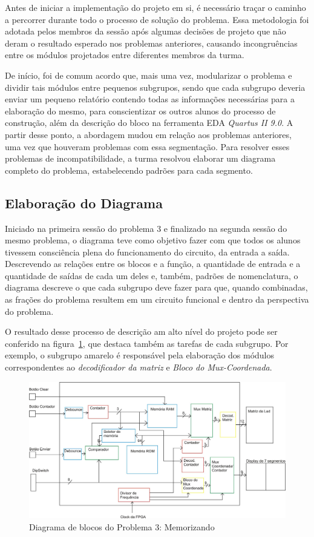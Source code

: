 \documentclass[12pt]{article}
\begin{document}
Antes de iniciar a implementação do projeto em si, é necessário traçar o caminho a percorrer durante todo o processo de solução do problema. Essa metodologia foi adotada pelos membros da sessão após algumas decisões de projeto que não deram o resultado esperado nos problemas anteriores, causando incongruências entre os módulos projetados entre diferentes membros da turma. 

De início, foi de comum acordo que, mais uma vez, modularizar o problema e dividir tais módulos entre pequenos subgrupos, sendo que cada subgrupo deveria enviar um pequeno relatório contendo todas as informações necessárias para a elaboração do mesmo, para conscientizar os outros alunos do processo de construção, além da descrição do bloco na ferramenta EDA \textit{Quartus II 9.0}. A partir desse ponto, a abordagem mudou em relação aos problemas anteriores, uma vez que houveram problemas com essa segmentação. Para resolver esses problemas de incompatibilidade, a turma resolvou elaborar um diagrama completo do problema, estabelecendo padrões para cada segmento.

\subsection{Elaboração do Diagrama}
Iniciado na primeira sessão do problema 3 e finalizado na segunda sessão do mesmo problema, o diagrama teve como objetivo fazer com que todos os alunos tivessem consciência plena do funcionamento do circuito, da entrada a saída. Descrevendo as relações entre os blocos e a função, a quantidade de entrada e a quantidade de saídas de cada um deles e, também,  padrões de nomenclatura, o diagrama descreve o que cada subgrupo deve fazer para que, quando combinadas, as frações do problema resultem em um circuito funcional e dentro da perspectiva do problema. 

O resultado desse processo de descrição am alto nível do projeto pode ser conferido na figura~\ref{fig:diagrama}, que destaca também as tarefas de cada subgrupo. Por exemplo, o subgrupo amarelo é responsável pela elaboração dos módulos correspondentes ao \textit{decodificador da matriz} e \textit{Bloco do Mux-Coordenada}.

\begin{figure}[H]
\centering
\includegraphics[width=1\textwidth]{img/diagrama.jpg}
\caption{Diagrama de blocos do Problema 3: Memorizando}
\label{fig:diagrama}
\end{figure}
\end{document}
